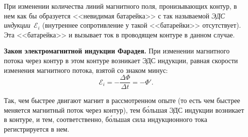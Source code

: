 \documentclass[main.tex]{subfiles}
\begin{document}
При изменении количества линий магнитного поля, пронизывающих контур, в нем как бы образуется <<невидимая батарейка>> с так называемой \emph{ЭДС индукции}~$\mathscr E_i$ (внутреннее сопротивление у такой <<батарейки>> отсутствует). Эта <<батарейка>> и вызывает ток в проводящем контуре в данном случае.
%
\begin{law}
    \textbf{Закон электромагнитной индукции Фарадея.} При изменении магнитного потока через контур в этом контуре возникает ЭДС индукции, равная скорости изменения магнитного потока, взятой со знаком минус:
    \begin{equation}
        \mathscr E_i=-\frac{\Delta \Phi}{\Delta t}=-\Phi'.
    \end{equation}
\end{law}
%
Так, чем быстрее двигают магнит в рассмотренном опыте (то есть чем быстрее меняется магнитный поток через контур), тем б\'ольшая ЭДС индукции возникает в контуре, и тем, соответственно, б\'ольшая сила индукционного тока регистрируется в нем.














 
\end{document}
